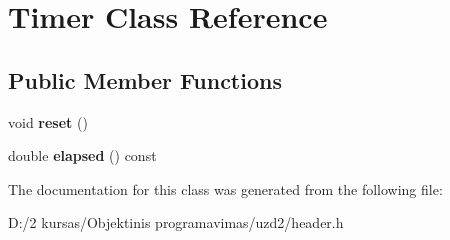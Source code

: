\hypertarget{class_timer}{}\section{Timer Class Reference}
\label{class_timer}
\subsection*{Public Member Functions}
\begin{DoxyCompactItemize}
\item 
\mbox{\label{class_timer_a9020542d73357a4eef512eefaf57524b}} 
void {\bfseries reset} ()
\item 
\mbox{\label{class_timer_a6a89a613c2af9b0d1e5f7e4ba9e46c54}} 
double {\bfseries elapsed} () const
\end{DoxyCompactItemize}


The documentation for this class was generated from the following file\+:\begin{DoxyCompactItemize}
\item 
D\+:/2 kursas/\+Objektinis programavimas/uzd2/header.\+h\end{DoxyCompactItemize}
